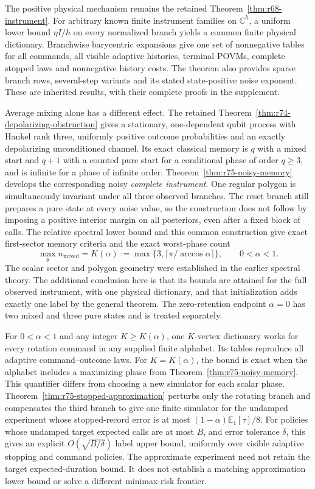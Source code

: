 The positive physical mechanism remains the retained
Theorem~\ref{thm:r68-instrument}. For arbitrary known finite instrument
families on $\mathbb C^h$, a uniform lower bound $\eta I/h$ on every
normalized branch yields a common finite physical dictionary. Branchwise
barycentric expansions give one set of nonnegative tables for all commands,
all visible adaptive histories, terminal POVMs, complete stopped laws and
nonnegative history costs. The theorem also provides sparse branch rows,
several-step variants and its stated state-positive noise exponent.
These are inherited results, with their complete proofs in the supplement.

Average mixing alone has a different effect. The retained
Theorem~\ref{thm:r74-depolarizing-obstruction} gives a stationary,
one-dependent qubit process with Hankel rank three, uniformly positive
outcome probabilities and an exactly depolarizing unconditioned channel.
Its exact classical memory is $q$ with a mixed start and $q+1$ with a counted
pure start for a conditional phase of order $q\ge3$, and is infinite for a
phase of infinite order. Theorem~\ref{thm:r75-noisy-memory} develops the corresponding
noisy \emph{complete instrument}. One regular polygon is simultaneously
invariant under all three observed branches. The reset branch still
prepares a pure state at every noise value, so the construction does not
follow by imposing a positive interior margin on all posteriors, even
after a fixed block of calls. The relative spectral lower
bound and this common construction give exact first-sector memory criteria
and the exact worst-phase count
\[
 \max_\theta n_{\mathrm{mixed}}=K(\alpha)
   :=\max\{3,\lceil\pi/\arccos\alpha\rceil\},\qquad 0<\alpha<1.
\]
The scalar sector and polygon geometry were established in the earlier
spectral theory. The additional conclusion here is that its bounds are
attained for the full observed instrument, with one physical dictionary,
and that initialization adds exactly one label by the general theorem.
The zero-retention endpoint $\alpha=0$ has two mixed and three pure
states and is treated separately.

For $0<\alpha<1$ and any integer $K\ge K(\alpha)$, one $K$-vertex
dictionary works for every rotation command in any supplied finite
alphabet. Its tables reproduce all adaptive command--outcome laws. For
$K=K(\alpha)$, the bound is exact when the alphabet includes a maximizing
phase from Theorem~\ref{thm:r75-noisy-memory}. This quantifier differs from choosing a new simulator
for each scalar phase. Theorem~\ref{thm:r75-stopped-approximation} perturbs only the rotating branch and compensates
the third branch to give one finite simulator for the undamped experiment
whose stopped-record error is at most $(1-\alpha)\mathbb E_1[\tau]/8$.
For policies whose undamped target expected calls are at most $B$,
and error tolerance $\delta$, this gives an
explicit $O(\sqrt{B/\delta})$ label upper bound, uniformly over visible
adaptive stopping and command policies. The approximate experiment need
not retain the target expected-duration bound. It does not establish a matching
approximation lower bound or solve a different minimax-risk frontier.

